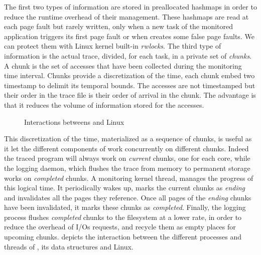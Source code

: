 The first two types of information are stored in preallocated hashmaps in order to reduce the
runtime overhead of their management.  These hashmaps are read at each page fault but rarely
written, only when a new task of the monitored application triggers its first page
fault or when \Moca creates some false page faults. We can protect
them with Linux kernel built-in \emph{rwlocks}.
The third type of information is the actual
trace, divided, for each task, in a private set of \emph{chunks}. A chunk is the set of
accesses that have been collected during the monitoring time interval. Chunks provide a discretization
of the time, each chunk embed two timestamp to delimit its temporal bounds.
The accesses are not timestamped but their order in the trace file is their
order of arrival in the chunk.
The advantage is that it reduces the volume of information stored for the accesses.

\begin{figure}[htb]
    \centering
    \caption{Interactions betweens \Moca and Linux}
    \label{fig:moca}
\end{figure}

This discretization of the time, materialized as a sequence of chunks, is useful as it let the
different components of \Moca work concurrently on different chunks.  Indeed the traced
program will always work on \emph{current} chunks, one for each core, while the logging daemon,
which flushes the trace from memory to permanent storage works on \emph{completed} chunks. A
monitoring kernel thread, manages the progress of this logical time. It periodically wakes up, marks the current chunks as
\emph{ending} and invalidates all the pages they reference. Once all pages of the \emph{ending}
chunks have been invalidated, it marks these chunks as \emph{completed}. Finally, the
logging process flushes \emph{completed} chunks to the filesystem at a lower
rate, in order to reduce the overhead of I/Os requests,
and recycle them as empty places for upcoming chunks.   depicts the interaction between the
different processes and threads of \Moca, its data structures and Linux.

